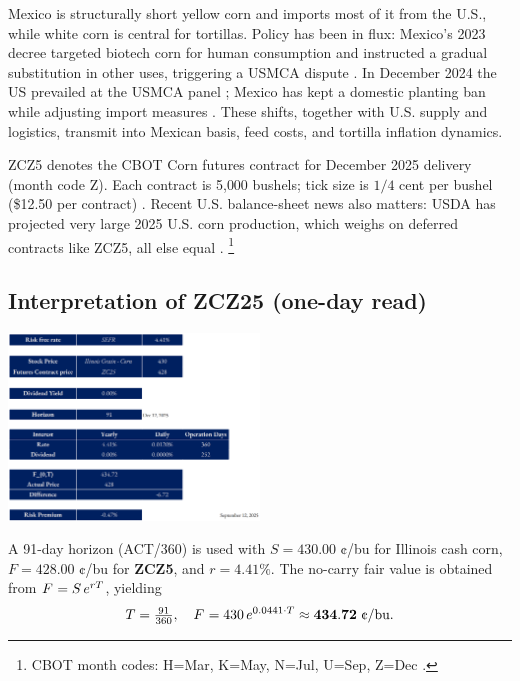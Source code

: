 \documentclass[10pt,a4paper]{article} %
\begin{document}
Mexico is structurally short yellow corn and imports most of it from the U.S., while white corn is central for tortillas. Policy has been in flux: Mexico's 2023 decree targeted biotech corn for human consumption and instructed a gradual substitution in other uses, triggering a USMCA dispute \citep{fas_mexico_decree_2023,ustr_usmca_biotech_2023}. In December 2024 the US prevailed at the USMCA panel \citep{ustr_usmca_biotech_win_2024}; Mexico has kept a domestic planting ban while adjusting import measures \citep{reuters_mexico_gm_ban_2025,fas_mexico_grain_annual_2025}. These shifts, together with U.S. supply and logistics, transmit into Mexican basis, feed costs, and tortilla inflation dynamics.

ZCZ5 denotes the CBOT Corn futures contract for December 2025 delivery (month code Z). Each contract is 5{,}000 bushels; tick size is $1/4$ cent per bushel (\$12.50 per contract) \citep{barchart_zc_specs}.
Recent U.S. balance-sheet news also matters: USDA has projected very large 2025 U.S. corn production, which weighs on deferred contracts like ZCZ5, all else equal \citep{reuters_record_crop_2025}.
\footnote{CBOT month codes: H=Mar, K=May, N=Jul, U=Sep, Z=Dec \citep{barchart_zc_specs}.}

\subsection{Interpretation of \texorpdfstring{ZCZ25}{ZCZ25} (one-day read)}

\begin{center}
\includegraphics[width=0.5\textwidth]{figures/corn2.png}
\end{center}

A 91-day horizon (ACT/360) is used with $S=430.00$ ¢/bu for Illinois cash corn, $F=428.00$ ¢/bu for \textbf{ZCZ5}, and $r=4.41\%$. The no-carry fair value is obtained from $F^{\*}=S\,e^{rT}$, yielding
\[
T=\tfrac{91}{360},\quad F^{\*}=430\,e^{0.0441\cdot T}\approx \mathbf{434.72}\ \text{¢/bu}.
\]
\end{document}
